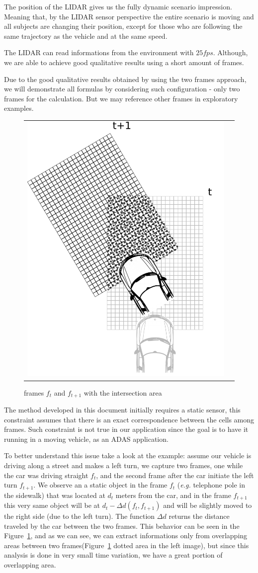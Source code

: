 The position of the LIDAR gives us the fully dynamic scenario impression. Meaning that, by the LIDAR sensor perspective the entire scenario is moving and all subjects are changing their position, except for those who are following the same trajectory as the vehicle and at the same speed. 

The LIDAR can read informations from the environment with $25fps$. Although, we are able to achieve good qualitative results using a short amount of frames. 

Due to the good qualitative results obtained by using the two frames approach, we will demonstrate all formulas by considering such configuration - only two frames for the calculation. But we may reference other frames in exploratory examples.


\begin{figure}[h]
   \centering
     \begin{tabular}{lr}
       \includegraphics[width=0.35\columnwidth]{img/fig:motion:algorithm:nonstatic:01}
     \end{tabular}
   \caption{frames $f_t$ and $f_{t+1}$ with the intersection area}
   \label{fig:motion:algorithm:nonstatic:01}
 \end{figure}

The method developed in this document initially requires a static sensor, this constraint assumes that there is an exact correspondence between the cells among frames. Such constraint is not true in our application since the goal is to have it running in a moving vehicle, as an ADAS application. 

To better understand this issue take a look at the example: assume our vehicle is driving along a street and makes a left turn, we capture two frames, one while the car was driving straight $f_t$, and the second frame  after the car initiate the left turn $f_{t+1}$. We observe an a static object in the frame $f_t$ (\textit{e.g.} telephone pole in the sidewalk) that was located at $d_t$ meters from the car, and in the frame $f_{t+1}$ this very same object will be at $d_t-\Delta d(f_t,f_{t+1})$ and will be slightly moved to the right side (due to the left turn). The function $\Delta d$ returns the distance traveled by the car between the two frames. This behavior can be seen in the Figure~\ref{fig:motion:algorithm:nonstatic:01}, and as we can see, we can extract informations only from overlapping areas between two frames(Figure~\ref{fig:motion:algorithm:nonstatic:01} dotted area in the left image), but since this analysis is done in very small time variation, we have a great portion of overlapping area.

